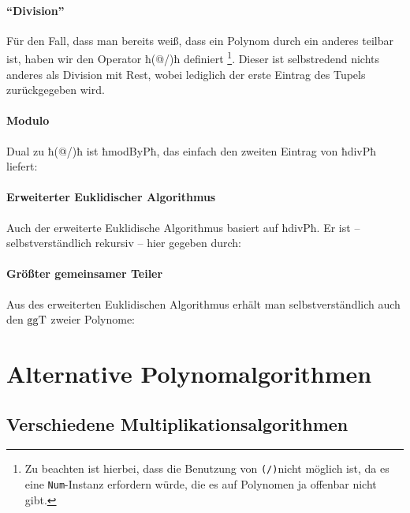 \paragraph{"`Division"'} Für den Fall, dass man bereits weiß, dass ein
Polynom durch ein anderes teilbar ist, haben wir den Operator ħ(@/)ħ definiert
\footnote{Zu beachten ist hierbei, dass die Benutzung 
von \lstinline{(/)}nicht möglich 
ist, da es eine \lstinline{Num}-Instanz erfordern würde, die es auf Polynomen ja
offenbar nicht gibt.}.
Dieser ist selbstredend nichts anderes als Division mit Rest, wobei lediglich
der erste Eintrag des Tupels zurückgegeben wird.



\paragraph{Modulo} Dual zu ħ(@/)ħ ist ħmodByPħ, das einfach den zweiten Eintrag
von ħdivPħ liefert:



\paragraph{Erweiterter Euklidischer Algorithmus} Auch der erweiterte
Euklidische Algorithmus basiert auf ħdivPħ. Er ist -- selbstverständlich
rekursiv -- hier gegeben durch:


\paragraph{Größter gemeinsamer Teiler} Aus des erweiterten Euklidischen
Algorithmus erhält man selbstverständlich auch den $\operatorname{ggT}$ zweier Polynome:









\section{Alternative Polynomalgorithmen}
\subsection{Verschiedene Multiplikationsalgorithmen}
\label{subsec:multAlgs}

